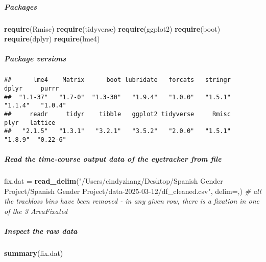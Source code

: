 \documentclass[
]{article}
\newenvironment{Shaded}{\begin{snugshade}}{\end{snugshade}}
\newcommand{\AttributeTok}[1]{\textcolor[rgb]{0.13,0.29,0.53}{#1}}
\newcommand{\CommentTok}[1]{\textcolor[rgb]{0.56,0.35,0.01}{\textit{#1}}}
\newcommand{\FunctionTok}[1]{\textcolor[rgb]{0.13,0.29,0.53}{\textbf{#1}}}
\newcommand{\NormalTok}[1]{#1}
\newcommand{\OtherTok}[1]{\textcolor[rgb]{0.56,0.35,0.01}{#1}}
\newcommand{\StringTok}[1]{\textcolor[rgb]{0.31,0.60,0.02}{#1}}
\begin{document}
\subparagraph{Packages}\label{packages}

\begin{Shaded}
\begin{Highlighting}[]
\FunctionTok{require}\NormalTok{(Rmisc)}
\FunctionTok{require}\NormalTok{(tidyverse)}
\FunctionTok{require}\NormalTok{(ggplot2)}
\FunctionTok{require}\NormalTok{(boot)}
\FunctionTok{require}\NormalTok{(dplyr)}
\FunctionTok{require}\NormalTok{(lme4)}
\end{Highlighting}
\end{Shaded}

\subparagraph{Package versions}\label{package-versions}

\begin{verbatim}
##      lme4    Matrix      boot lubridate   forcats   stringr     dplyr     purrr 
##  "1.1-37"   "1.7-0"  "1.3-30"   "1.9.4"   "1.0.0"   "1.5.1"   "1.1.4"   "1.0.4" 
##     readr     tidyr    tibble   ggplot2 tidyverse     Rmisc      plyr   lattice 
##   "2.1.5"   "1.3.1"   "3.2.1"   "3.5.2"   "2.0.0"   "1.5.1"   "1.8.9"  "0.22-6"
\end{verbatim}

\subparagraph{Read the time-course output data of the eyetracker from
file}\label{read-the-time-course-output-data-of-the-eyetracker-from-file}

\begin{Shaded}
\begin{Highlighting}[]
\NormalTok{fix.dat }\OtherTok{=} \FunctionTok{read\_delim}\NormalTok{(}\StringTok{"/Users/cindyzhang/Desktop/Spanish Gender Project/Spanish Gender Project/data{-}2025{-}03{-}12/df\_cleaned.csv"}\NormalTok{, }\AttributeTok{delim=}\StringTok{\textquotesingle{},\textquotesingle{}}\NormalTok{)}
\CommentTok{\# all the trackloss bins have been removed {-} in any given row, there is a fixation in one of the 3 AreaFixated }
\end{Highlighting}
\end{Shaded}

\subparagraph{Inspect the raw data}\label{inspect-the-raw-data}

\begin{Shaded}
\begin{Highlighting}[]
\FunctionTok{summary}\NormalTok{(fix.dat)}
\end{Highlighting}
\end{Shaded}
\end{document}
